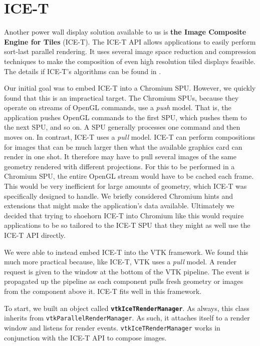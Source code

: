 \documentclass{acmsiggraph}
\newcommand{\cidentifier}[1]{\texttt{#1}}
\newcommand{\keyterm}[1]{\textbf{#1}}
\begin{document}
  \section{ICE-T}
  \label{sec:ICE-T}

  Another power wall display solution available to us is \keyterm{the Image
  Composite Engine for Tiles} (ICE-T).  The ICE-T API allows applications
  to easily perform sort-last parallel rendering.  It uses several image
  space reduction and compression techniques to make the composition of
  even high resolution tiled displays feasible.  The details if ICE-T's
  algorithms can be found in \cite{Moreland01}.

  Our initial goal was to embed ICE-T into a Chromium SPU.  However, we
  quickly found that this is an impractical target.  The Chromium SPUs,
  because they operate on streams of OpenGL commands, use a \emph{push}
  model.  That is, the application pushes OpenGL commands to the first SPU,
  which pushes them to the next SPU, and so on.  A SPU generally processes
  one command and then moves on.  In contrast, ICE-T uses a \emph{pull}
  model.  ICE-T can perform compositions for images that can be much larger
  then what the available graphics card can render in one shot.  It
  therefore may have to pull several images of the same geometry rendered
  with different projections.  For this to be performed in a Chromium SPU,
  the entire OpenGL stream would have to be cached each frame.  This would
  be very inefficient for large amounts of geometry, which ICE-T was
  specifically designed to handle.  We briefly considered Chromium hints
  and extensions that might make the application's data available.
  Ultimately we decided that trying to shoehorn ICE-T into Chromium like
  this would require applications to be so tailored to the ICE-T SPU that
  they might as well use the ICE-T API directly.

  We were able to instead embed ICE-T into the VTK framework.  We found
  this much more practical because, like ICE-T, VTK uses a \emph{pull}
  model.  A render request is given to the window at the bottom of the VTK
  pipeline.  The event is propagated up the pipeline as each component
  pulls fresh geometry or images from the component above it.  ICE-T fits
  well in this framework.

  To start, we built an object called
  \keyterm{\cidentifier{vtk\-Ice\-T\-Render\-Manager}}.  As always, this
  class inherits from \cidentifier{vtk\-Parallel\-Render\-Manager}.  As
  such, it attaches itself to a render window and listens for render
  events.  \cidentifier{vtk\-Ice\-T\-Render\-Manager} works in conjunction
  with the ICE-T API to compose images.
\end{document}
